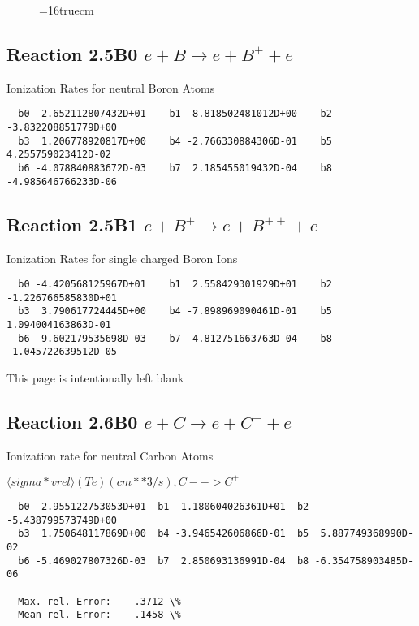 \documentclass[12pt,dvipdfmx]{article}
\begin{document}
\begin{figure} \label{2.4B}
\epsfxsize=16truecm
\end{figure}
\newpage

\subsection{
Reaction 2.5B0   $e + B \rightarrow e + B^+ + e $
}

 Ionization Rates for neutral Boron Atoms


\begin{small}\begin{verbatim}
  b0 -2.652112807432D+01    b1  8.818502481012D+00    b2 -3.832208851779D+00
  b3  1.206778920817D+00    b4 -2.766330884306D-01    b5  4.255759023412D-02
  b6 -4.078840883672D-03    b7  2.185455019432D-04    b8 -4.985646766233D-06
\end{verbatim}\end{small}

\subsection{
Reaction 2.5B1   $e + B^+ \rightarrow e + B^{++} + e $
}

 Ionization Rates for single charged Boron Ions


\begin{small}\begin{verbatim}
  b0 -4.420568125967D+01    b1  2.558429301929D+01    b2 -1.226766585830D+01
  b3  3.790617724445D+00    b4 -7.898969090461D-01    b5  1.094004163863D-01
  b6 -9.602179535698D-03    b7  4.812751663763D-04    b8 -1.045722639512D-05
\end{verbatim}\end{small}

\newpage
This page is intentionally left blank
\newpage

\subsection{
Reaction 2.6B0   $e + C \rightarrow e + C^+ + e  $
}

  Ionization rate for neutral Carbon Atoms

  $ \langle sigma*vrel \rangle(Te)  (cm**3/s), C --> C^+$

\begin{small}\begin{verbatim}
  b0 -2.955122753053D+01  b1  1.180604026361D+01  b2 -5.438799573749D+00
  b3  1.750648117869D+00  b4 -3.946542606866D-01  b5  5.887749368990D-02
  b6 -5.469027807326D-03  b7  2.850693136991D-04  b8 -6.354758903485D-06

  Max. rel. Error:    .3712 \%
  Mean rel. Error:    .1458 \%





\end{verbatim}\end{small}
\end{document}

